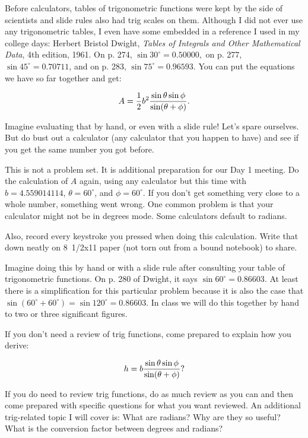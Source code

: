 Before calculators, tables of trigonometric functions were kept by the side of scientists and slide rules also had trig scales on them. Although I did not ever use any trigonometric tables, I even have some embedded in a reference I used in my college days: Herbert Bristol Dwight, {\it Tables of Integrals and Other Mathematical Data}, 4th edition, 1961. On p. 274, $\sin 30^{\circ} = 0.50000,$ on p. 277, $\sin 45^{\circ}=0.70711$, and on p. 283, $\sin 75^{\circ}=0.96593.$ You can put the equations we have so far together and get:

$$A={1\over 2} b^2 {\sin\theta \sin\phi \over \sin (\theta + \phi)}.$$

\noindent Imagine evaluating that by hand, or even with a slide rule! Let's spare ourselves. But do bust out a calculator (any calculator that you happen to have) and see if you get the same number you got before.
\bigskip

\nobreak\bigskip

\noindent This is not a problem set. It is additional preparation for our Day 1 meeting. Do the calculation of $A$ again, using any calculator but this time with $b=4.559014114$, $\theta=60^{\circ}$, and $\phi=60^{\circ}$. If you don't get something very close to a whole number, something went wrong. One common problem is that your calculator might not be in degrees mode. Some calculators default to radians.

Also, record every keystroke you pressed when doing this calculation. Write that down neatly on 8~1/2x11 paper (not torn out from a bound notebook) to share.

Imagine doing this by hand or with a slide rule after consulting your table of trigonometric functions.  On p. 280 of Dwight, it says $\sin 60^{\circ} = 0.86603.$ At least there is a simplification for this particular problem because it is also the case that $\sin (60^{\circ}+60^{\circ}) = \sin 120^{\circ} = 0.86603.$ In class we will do this together by hand to two or three significant figures.
\bigskip

\nobreak\bigskip

\noindent If you don't need a review of trig functions, come prepared to explain how you derive:

$$h=b{\sin\theta \sin\phi \over \sin (\theta + \phi)}?$$

\noindent If you do need to review trig functions, do as much review as you can and then come prepared with specific questions for what you want reviewed. An additional trig-related topic I will cover is: What are radians? Why are they so useful? What is the conversion factor between degrees and radians?

\bye
